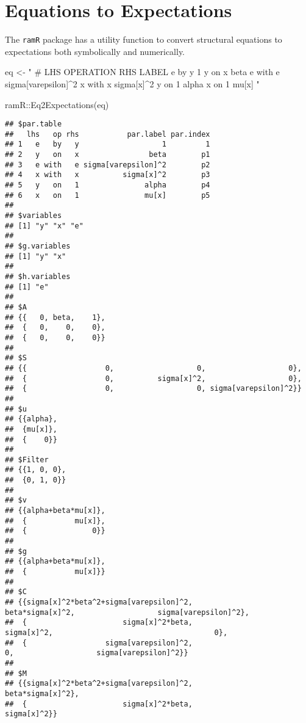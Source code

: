 \documentclass[
]{book}
\newenvironment{Shaded}{\begin{snugshade}}{\end{snugshade}}
\newcommand{\FunctionTok}[1]{\textcolor[rgb]{0.00,0.00,0.00}{#1}}
\newcommand{\NormalTok}[1]{#1}
\newcommand{\OtherTok}[1]{\textcolor[rgb]{0.56,0.35,0.01}{#1}}
\newcommand{\SpecialCharTok}[1]{\textcolor[rgb]{0.00,0.00,0.00}{#1}}
\newcommand{\StringTok}[1]{\textcolor[rgb]{0.31,0.60,0.02}{#1}}
\theoremstyle{definition}
\theoremstyle{definition}
\theoremstyle{definition}
\theoremstyle{remark}
\begin{document}
\hypertarget{equations-to-expectations}{%
\section{Equations to Expectations}\label{equations-to-expectations}}

The \texttt{ramR} package has a utility function
to convert structural equations to expectations
both symbolically and numerically.

\begin{Shaded}
\begin{Highlighting}[]
\NormalTok{eq }\OtherTok{\textless{}{-}} \StringTok{"}
\StringTok{  \# LHS OPERATION RHS LABEL}
\StringTok{  e     by        y   1}
\StringTok{  y     on        x   beta}
\StringTok{  e     with      e   sigma[varepsilon]\^{}2}
\StringTok{  x     with      x   sigma[x]\^{}2}
\StringTok{  y     on        1   alpha}
\StringTok{  x     on        1   mu[x]}
\StringTok{"}
\end{Highlighting}
\end{Shaded}

\begin{Shaded}
\begin{Highlighting}[]
\NormalTok{ramR}\SpecialCharTok{::}\FunctionTok{Eq2Expectations}\NormalTok{(eq)}
\end{Highlighting}
\end{Shaded}

\begin{verbatim}
## $par.table
##   lhs   op rhs           par.label par.index
## 1   e   by   y                   1         1
## 2   y   on   x                beta        p1
## 3   e with   e sigma[varepsilon]^2        p2
## 4   x with   x          sigma[x]^2        p3
## 5   y   on   1               alpha        p4
## 6   x   on   1               mu[x]        p5
## 
## $variables
## [1] "y" "x" "e"
## 
## $g.variables
## [1] "y" "x"
## 
## $h.variables
## [1] "e"
## 
## $A
## {{   0, beta,    1},
##  {   0,    0,    0},
##  {   0,    0,    0}} 
## 
## $S
## {{                  0,                   0,                   0},
##  {                  0,          sigma[x]^2,                   0},
##  {                  0,                   0, sigma[varepsilon]^2}} 
## 
## $u
## {{alpha},
##  {mu[x]},
##  {    0}} 
## 
## $Filter
## {{1, 0, 0},
##  {0, 1, 0}} 
## 
## $v
## {{alpha+beta*mu[x]},
##  {           mu[x]},
##  {               0}} 
## 
## $g
## {{alpha+beta*mu[x]},
##  {           mu[x]}} 
## 
## $C
## {{sigma[x]^2*beta^2+sigma[varepsilon]^2,                       beta*sigma[x]^2,                   sigma[varepsilon]^2},
##  {                      sigma[x]^2*beta,                            sigma[x]^2,                                     0},
##  {                  sigma[varepsilon]^2,                                     0,                   sigma[varepsilon]^2}} 
## 
## $M
## {{sigma[x]^2*beta^2+sigma[varepsilon]^2,                       beta*sigma[x]^2},
##  {                      sigma[x]^2*beta,                            sigma[x]^2}}
\end{verbatim}
\end{document}
